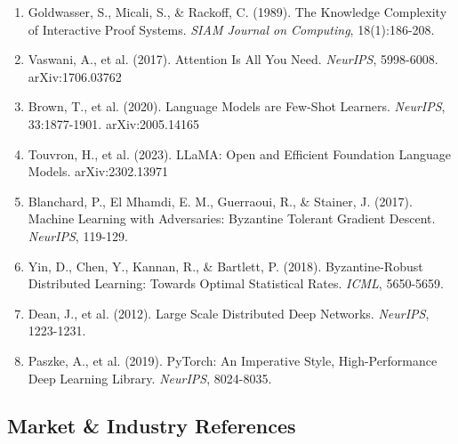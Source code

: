 \documentclass[11pt,a4paper]{article}
\begin{document}
\begin{enumerate}
    \item Goldwasser, S., Micali, S., \& Rackoff, C. (1989). The Knowledge Complexity of Interactive Proof Systems. \textit{SIAM Journal on Computing}, 18(1):186-208.

    \item Vaswani, A., et al. (2017). Attention Is All You Need. \textit{NeurIPS}, 5998-6008. arXiv:1706.03762

    \item Brown, T., et al. (2020). Language Models are Few-Shot Learners. \textit{NeurIPS}, 33:1877-1901. arXiv:2005.14165

    \item Touvron, H., et al. (2023). LLaMA: Open and Efficient Foundation Language Models. arXiv:2302.13971

    \item Blanchard, P., El Mhamdi, E. M., Guerraoui, R., \& Stainer, J. (2017). Machine Learning with Adversaries: Byzantine Tolerant Gradient Descent. \textit{NeurIPS}, 119-129.

    \item Yin, D., Chen, Y., Kannan, R., \& Bartlett, P. (2018). Byzantine-Robust Distributed Learning: Towards Optimal Statistical Rates. \textit{ICML}, 5650-5659.

    \item Dean, J., et al. (2012). Large Scale Distributed Deep Networks. \textit{NeurIPS}, 1223-1231.

    \item Paszke, A., et al. (2019). PyTorch: An Imperative Style, High-Performance Deep Learning Library. \textit{NeurIPS}, 8024-8035.
\end{enumerate}

\subsection*{Market \& Industry References}
\end{document}
